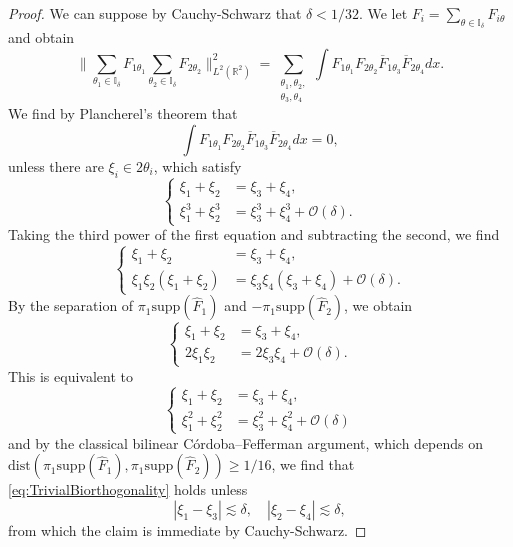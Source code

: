 \documentclass[10pt,a4paper]{amsart}
\newcommand{\R}{\mathbb{R}}
\begin{document}
\begin{proof}
We can suppose by Cauchy-Schwarz that $\delta < 1/32$.
We let $F_i = \sum_{\theta \in \mathbb{I}_{\delta}} F_{i \theta}$ and obtain
\begin{equation*}
\big\| \sum_{\theta_1 \in \mathbb{I}_{\delta}} F_{1 \theta_1} \sum_{\theta_2 \in \mathbb{I}_{\delta}} F_{2 \theta_2} \big\|^2_{L^2(\R^2)} = \sum_{\substack{\theta_1,\theta_2, \\ \theta_3,\theta_4}} \int F_{1 \theta_1} F_{2 \theta_2} \overline{F}_{1 \theta_3} \overline{F}_{2 \theta_4} dx.
\end{equation*}
We find by Plancherel's theorem that
\begin{equation}
\label{eq:TrivialBiorthogonality}
\int F_{1 \theta_1} F_{2 \theta_2} \overline{F}_{1 \theta_3} \overline{F}_{2 \theta_4} dx = 0,
\end{equation}
unless there are $\xi_i \in 2 \theta_i$, which satisfy
\begin{equation*}
\left\{ \begin{array}{cl}
\xi_1 + \xi_2 &= \xi_3 + \xi_4, \\
\xi_1^3 + \xi_2^3 &= \xi_3^3 + \xi_4^3 + \mathcal{O}(\delta).
\end{array} \right.
\end{equation*}
Taking the third power of the first equation and subtracting the second, we find
\begin{equation*}
\left\{ \begin{array}{cl}
\xi_1 + \xi_2 &= \xi_3 + \xi_4, \\
\xi_1 \xi_2 (\xi_1+\xi_2) &= \xi_3 \xi_4(\xi_3 + \xi_4) + \mathcal{O}(\delta).
\end{array} \right.
\end{equation*}
By the separation of $\pi_1 \text{supp}(\hat{F}_1)$ and $-\pi_1 \text{supp}(\hat{F}_2)$, we obtain
\begin{equation*}
\left\{ \begin{array}{cl}
\xi_1 + \xi_2 &= \xi_3 + \xi_4, \\
2 \xi_1 \xi_2  &=  2 \xi_3 \xi_4 + \mathcal{O}(\delta).
\end{array} \right.
\end{equation*}
This is equivalent to
\begin{equation}
\label{eq:BiorthogonalityAux}
\left\{ \begin{array}{cl}
\xi_1 + \xi_2 &= \xi_3 + \xi_4, \\
\xi_1^2 + \xi_2^2  &=  \xi_3^2 + \xi_4^2 + \mathcal{O}(\delta)
\end{array} \right.
\end{equation}
and by the classical bilinear C\'ordoba--Fefferman argument, which depends on \\ $\text{dist}(\pi_1 \text{supp}(\hat{F}_1),\pi_1 \text{supp}(\hat{F}_2)) \geq 1/16$, we find that \eqref{eq:TrivialBiorthogonality} holds unless
\begin{equation}
\label{eq:Biorthogonality}
|\xi_1 - \xi_3| \lesssim \delta, \quad |\xi_2 - \xi_4 | \lesssim \delta,
\end{equation}
from which the claim is immediate by Cauchy-Schwarz. 


\end{proof}
\end{document}
